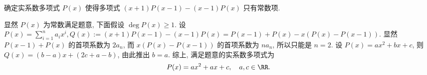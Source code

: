 \begin{prob}
\label{prob:prob-9}
确定实系数多项式 $P(x)$ 使得多项式
$(x+1)P(x-1) - (x-1)P(x)$ 只有常数项.
\end{prob}

\begin{soln}
显然 $P(x)$ 为常数满足题意, 下面假设 $\deg P(x) \ge 1$.
设 $P(x) = \sum_{i=1}^n a_ix^i, \allowbreak Q(x) := (x+1)P(x-1)-(x-1)P(x)
=P(x-1)+P(x) - x(P(x)-P(x-1))$.
显然 $P(x-1) + P(x)$ 的首项系数为 $2a_n$,
而 $x(P(x) - P(x-1))$ 的首项系数为 $na_n$,
所以只能是 $n=2$. 设 $P(x) = ax^2 + bx + c$,
则 $Q(x) = (b-a)x + (2c+a-b)$, 由此推出 $b=a$.
综上, 满足题意的实系数多项式为
\begin{equation}
\label{eq12}
P(x) = ax^2 + ax + c, \quad a,c \in \RR.
\end{equation}
\end{soln}

